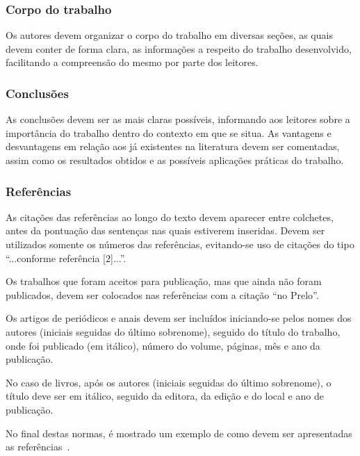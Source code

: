 \documentclass[portugues]{sobraep}
\begin{document}
\subsubsection{Corpo do trabalho}
Os autores devem organizar o corpo do trabalho em diversas seções, as quais devem conter de forma clara, as informações a respeito do trabalho desenvolvido, facilitando a compreensão do mesmo por parte dos leitores.

\subsubsection{Conclusões}
As conclusões devem ser as mais claras possíveis, informando aos leitores sobre a importância do trabalho dentro do contexto em que se situa. As vantagens e desvantagens em relação aos já existentes na literatura devem ser comentadas, assim como os resultados obtidos e as possíveis aplicações práticas do trabalho.

\subsubsection{Referências}
As citações das referências ao longo do texto devem aparecer entre colchetes, antes da pontuação das sentenças nas quais estiverem inseridas. Devem ser utilizados somente os números das referências, evitando-se uso de citações do tipo ``...conforme referência [2]...''.

Os trabalhos que foram aceitos para publicação, mas que ainda não foram publicados, devem ser colocados nas referências com a citação ``no Prelo''.

Os artigos de periódicos e anais devem ser incluídos iniciando-se pelos nomes dos autores (iniciais seguidas do último sobrenome), seguido do título do trabalho, onde foi publicado (em itálico), número do volume, páginas, mês e ano da publicação.

No caso de livros, após os autores (iniciais seguidas do último sobrenome), o título deve ser em itálico, seguido da editora, da edição e do local e ano de publicação.

No final destas normas, é mostrado um exemplo de como devem ser apresentadas as referências~\cite{refbib1,refbib2,refbib3,refbib4,refbib5,refbib6,refbib7,refbib8}.

\end{document}
